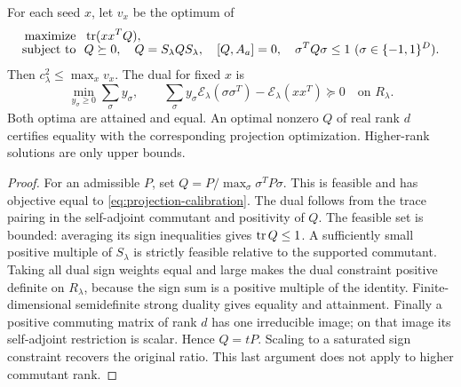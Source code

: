 \begin{proposition}\label{prop:calibration-sdp}
For each seed $x$, let $v_x$ be the optimum of
\begin{align}\label{eq:calibration-sdp}
 \text{maximize }&\ \operatorname{tr}(xx^TQ),\\[-2mm]
 \text{subject to }&\ Q\succeq0,\quad Q=S_\lambda Q S_\lambda,
 \quad [Q,A_a]=0,\quad\sigma^TQ\sigma\le1\ (\sigma\in\{-1,1\}^D).\notag
\end{align}
Then $c_\lambda^2\le\max_xv_x$. The dual for fixed $x$ is
\begin{equation}\label{eq:calibration-dual}
 \min_{y_\sigma\ge0}\sum_\sigma y_\sigma,
 \qquad
 \sum_\sigma y_\sigma\mathcal E_\lambda(\sigma\sigma^T)
       -\mathcal E_\lambda(xx^T)\succeq0
       \quad\text{on }R_\lambda.
\end{equation}
Both optima are attained and equal. An optimal nonzero $Q$ of real rank $d$ certifies equality with the corresponding projection optimization. Higher-rank solutions are only upper bounds.
\end{proposition}
\begin{proof}
For an admissible $P$, set $Q=P/\max_\sigma\sigma^TP\sigma$. This is feasible and has objective equal to \eqref{eq:projection-calibration}. The dual follows from the trace pairing in the self-adjoint commutant and positivity of $Q$. The feasible set is bounded: averaging its sign inequalities gives $\operatorname{tr} Q\le1$. A sufficiently small positive multiple of $S_\lambda$ is strictly feasible relative to the supported commutant. Taking all dual sign weights equal and large makes the dual constraint positive definite on $R_\lambda$, because the sign sum is a positive multiple of the identity. Finite-dimensional semidefinite strong duality gives equality and attainment. Finally a positive commuting matrix of rank $d$ has one irreducible image; on that image its self-adjoint restriction is scalar. Hence $Q=tP$. Scaling to a saturated sign constraint recovers the original ratio. This last argument does not apply to higher commutant rank.
\end{proof}

